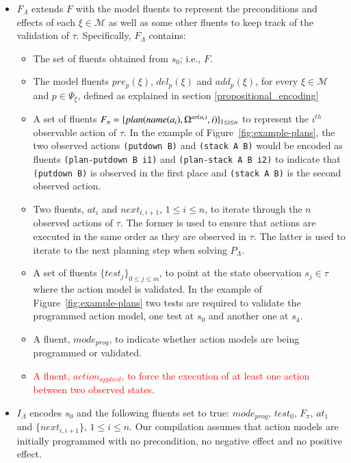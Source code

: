 \begin{itemize}

\item $F_{\Lambda}$ extends $F$ with the model fluents to represent the preconditions and effects of each $\xi\in\mathcal{M}$ as well as some other fluents to keep track of the validation of $\tau$. Specifically, $F_{\Lambda}$ contains:
\begin{itemize}
\item The set of fluents obtained from $s_0$; i.e., $F$.
\item The model fluents $pre_p(\xi)$, $del_p(\xi)$ and $add_p(\xi)$, for every $\xi \in \mathcal{M}$ and $p\in \Psi_{\xi}$, defined as explained in section \ref{propositional_encoding}
\item A set of fluents $F_{\pi}=\{plan(name(a_i),\Omega^{ar(a_i)},i)\}_{\small 1\leq i\leq n}$ to represent the $i^{th}$ observable action of $\tau$. In the example of Figure~\ref{fig:example-plans}, the two observed actions {\small \texttt{(putdown B)}} and {\small \texttt{(stack  A  B)}} would be encoded as fluents  {\small \texttt{(plan-putdown B i1)}} and {\small \texttt{(plan-stack A B i2)}} to indicate that {\small \texttt{(putdown B)}} is observed in the first place and {\small \texttt{(stack  A  B)}} is the second observed action.
\item Two fluents, $at_i$ and $next_{i,i+1}$, {\small $1\leq i \leq n$}, to iterate through the $n$ observed actions of $\tau$. The former is used to ensure that actions are executed in the same order as they are observed in $\tau$. The latter is used to iterate to the next planning step when solving $P_{\Lambda}$.
\item A set of fluents $\{test_j\}_{0\leq j\leq m}$, to point at the state observation $s_j\in\tau$ where the action model is
validated. In the example of Figure~\ref{fig:example-plans} two tests are required to validate the programmed action model, one test at $s_0$ and another one at $s_4$.
\item A fluent, $mode_{prog}$, to indicate whether action models are being programmed or validated.
\item \textcolor{red}{A fluent, $action_{applied}$, to force the execution of at least one action between two observed states.}
\end{itemize}

\item $I_{\Lambda}$ encodes $s_0$ and the following fluents set to true: $mode_{prog}$, $test_0$, $F_{\pi}$, $at_1$ and $\{next_{i,i+1}\}$, {\small $1\leq i \leq n$}. Our compilation assumes that action models are initially programmed with no precondition, no negative effect and no positive effect.


\end{itemize}

